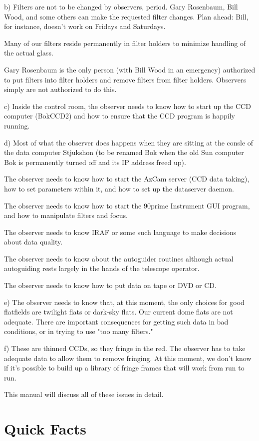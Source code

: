 \documentclass[letterpaper,12pt]{article}
\begin{document}
b) Filters are not to be changed by observers, period.
Gary Rosenbaum, Bill Wood, and some others can make the requested
filter changes. Plan ahead: Bill, for instance, doesn't work
on Fridays and Saturdays.

Many of our filters reside permanently in filter holders to
minimize handling of the actual glass. 

Gary Rosenbaum is the only person (with Bill Wood in an emergency)
authorized to put filters into filter holders and remove
filters from filter holders. Observers simply are not
authorized to do this.

c) Inside the control room, the observer needs to know
how to start up the CCD computer (BokCCD2) and how to
ensure that the CCD program is happily running.

d) Most of what the observer does happens when they are sitting
at the consle of the data computer Stjukshon (to be renamed Bok
when the old Sun computer Bok is permanently turned off
and its IP address freed up).

The observer needs to know how to start the AzCam server (CCD data
taking), how to set parameters within it, and how to set
up the dataserver daemon.

The observer needs to know how to start the 90prime Instrument GUI
program, and how to manipulate filters and focus.

The observer needs to know IRAF or some such language to make
decisions about data quality.

The observer needs to know about the autoguider routines although
actual autoguiding rests largely in the hands of the telescope
operator.

The observer needs to know how to put data on tape or DVD or CD.

e) The observer needs to know that, at this moment, the only choices
for good flatfields are twilight flats or dark-sky flats.
Our current dome flats are not adequate. There are important
consequences for getting such data in bad conditions, or in trying
to use "too many filters."

f) These are thinned CCDs, so they fringe in the red. The observer
has to take adequate data to allow them to remove fringing.
At this moment, we don't know if it's possible to build up
a library of fringe frames that will work from run to run.

This manual will discuss all of these issues in detail.

\section{Quick Facts}
\end{document}
